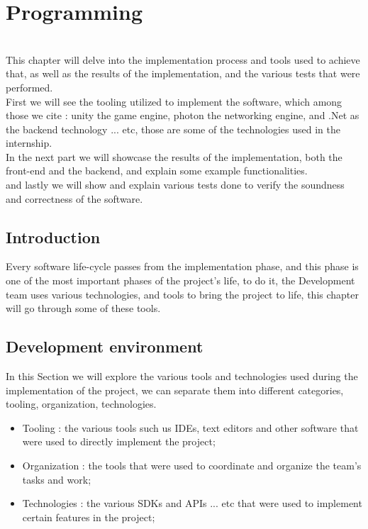 \chapter{Programming}%
\label{chap:chapter_four}
\vspace{25pt} {
  \hrulefill \\%
  This chapter will delve into the implementation process and tools used to achieve that, as well as the results of the implementation, and 
  the various tests that were performed.\\
  First we will see the tooling utilized to implement the software, which among those we cite : unity the game engine, photon the networking 
  engine, and .Net as the backend technology ... etc, those are some of the technologies used in the internship.\\
  In the next part we will showcase the results of the implementation, both the front-end and the backend, and explain 
  some example functionalities.\\
  and lastly we will show and explain various tests done to verify the soundness and correctness of the software.  
  \hrulefill\\
}
\pagebreak

\section{\textnormal{Introduction}}
\label{chap:section_one}
    Every software life-cycle passes from the implementation phase, and this phase
    is one of the most important phases of the project's life, to do it, the Development team 
    uses various technologies, and tools to bring the project to life, this chapter will go through
    some of these tools.  
\section{\textnormal{Development environment}}
\label{chap:section_one}
  In this Section we will explore the various tools and technologies used during the implementation of the project, 
  we can separate them into different categories, tooling, organization, technologies.
  \begin{itemize}
    \item Tooling : the various tools such us IDEs, text editors and other software that were used to directly implement the project;
    \item Organization : the tools that were used to coordinate and organize the team's tasks and work;
    \item Technologies : the various SDKs and APIs ... etc that were used to implement certain features in the project;
  \end{itemize}
